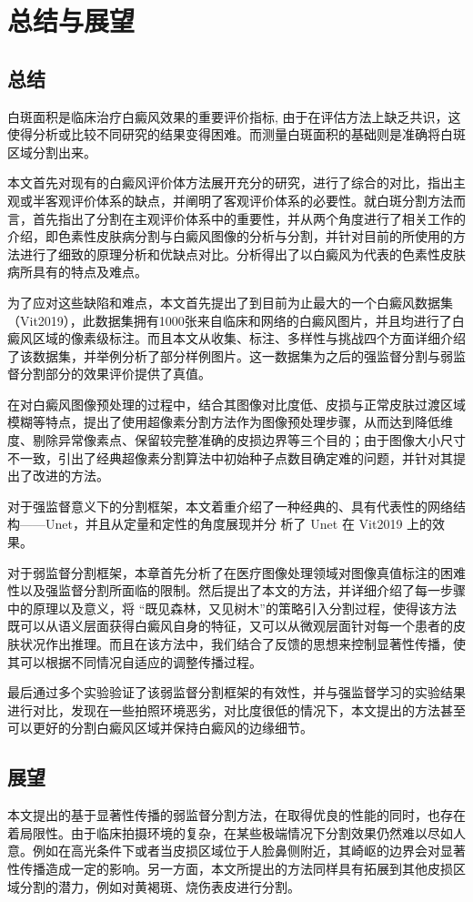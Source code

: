 \chapter{总结与展望}
\section{总结}
白斑面积是临床治疗白癜风效果的重要评价指标, 由于在评估方法上缺乏共识，这使得分析或比较不同研究的结果变得困难。而测量白斑面积的基础则是准确将白斑区域分割出来。

本文首先对现有的白癜风评价体方法展开充分的研究，进行了综合的对比，指出主观或半客观评价体系的缺点，并阐明了客观评价体系的必要性。就白斑分割方法而言，首先指出了分割在主观评价体系中的重要性，并从两个角度进行了相关工作的介绍，即色素性皮肤病分割与白癜风图像的分析与分割，并针对目前的所使用的方法进行了细致的原理分析和优缺点对比。分析得出了以白癜风为代表的色素性皮肤病所具有的特点及难点。

为了应对这些缺陷和难点，本文首先提出了到目前为止最大的一个白癜风数据集（Vit2019），此数据集拥有1000张来自临床和网络的白癜风图片，并且均进行了白癜风区域的像素级标注。而且本文从收集、标注、多样性与挑战四个方面详细介绍了该数据集，并举例分析了部分样例图片。这一数据集为之后的强监督分割与弱监督分割部分的效果评价提供了真值。

在对白癜风图像预处理的过程中，结合其图像对比度低、皮损与正常皮肤过渡区域模糊等特点，提出了使用超像素分割方法作为图像预处理步骤，从而达到降低维度、剔除异常像素点、保留较完整准确的皮损边界等三个目的；由于图像大小尺寸不一致，引出了经典超像素分割算法中初始种子点数目确定难的问题，并针对其提出了改进的方法。

对于强监督意义下的分割框架，本文着重介绍了一种经典的、具有代表性的网络结构——Unet，并且从定量和定性的角度展现并分 析了 Unet 在 Vit2019 上的效果。

对于弱监督分割框架，本章首先分析了在医疗图像处理领域对图像真值标注的困难性以及强监督分割所面临的限制。然后提出了本文的方法，并详细介绍了每一步骤中的原理以及意义，将 “既见森林，又见树木”的策略引入分割过程，使得该方法既可以从语义层面获得白癜风自身的特征，又可以从微观层面针对每一个患者的皮肤状况作出推理。而且在该方法中，我们结合了反馈的思想来控制显著性传播，使其可以根据不同情况自适应的调整传播过程。

最后通过多个实验验证了该弱监督分割框架的有效性，并与强监督学习的实验结果进行对比，发现在一些拍照环境恶劣，对比度很低的情况下，本文提出的方法甚至可以更好的分割白癜风区域并保持白癜风的边缘细节。

\section{展望}
本文提出的基于显著性传播的弱监督分割方法，在取得优良的性能的同时，也存在着局限性。由于临床拍摄环境的复杂，在某些极端情况下分割效果仍然难以尽如人意。例如在高光条件下或者当皮损区域位于人脸鼻侧附近，其崎岖的边界会对显著性传播造成一定的影响。另一方面，本文所提出的方法同样具有拓展到其他皮损区域分割的潜力，例如对黄褐斑、烧伤表皮进行分割。

